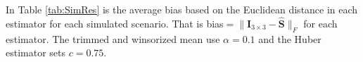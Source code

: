 \documentclass{article}\usepackage[]{graphicx}\usepackage[]{color}
\begin{document}
In Table \ref{tab:SimRes} is the average bias based on the Euclidean distance in each estimator for each simulated scenario.  That is bias$=\|\bm I_{3\times 3}-\widehat{\bm S}\|_F$ for each estimator.  The trimmed and winsorized mean use $\alpha=0.1$ and the Huber estimator sets $c=0.75$.





%   
\end{document}
